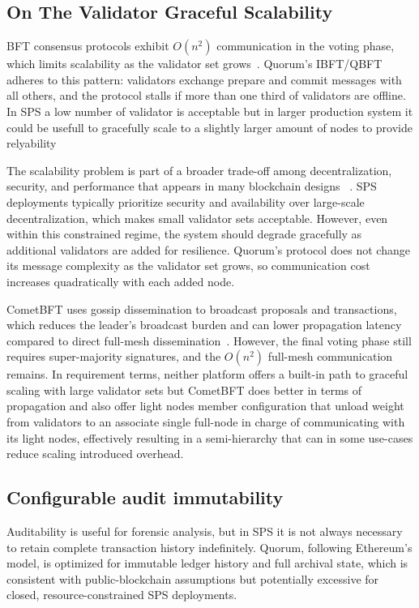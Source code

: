 \subsection{On The Validator Graceful Scalability}
BFT consensus protocols exhibit $O(n^2)$ communication in the voting phase, which limits scalability as the validator set grows~\cite{wang2022bft}. Quorum's IBFT/QBFT adheres to this pattern: validators exchange prepare and commit messages with all others, and the protocol stalls if more than one third of validators are offline. In SPS a low number of validator is acceptable but in larger production system it could be usefull to gracefully scale to a slightly larger amount of nodes to provide relyability

The scalability problem is part of a broader trade-off among decentralization, security, and performance that appears in many blockchain designs ~\cite{monte2020scaling}. SPS deployments typically prioritize security and availability over large-scale decentralization, which makes small validator sets acceptable. However, even within this constrained regime, the system should degrade gracefully as additional validators are added for resilience. Quorum's protocol does not change its message complexity as the validator set grows, so communication cost increases quadratically with each added node.

CometBFT uses gossip dissemination to broadcast proposals and transactions, which reduces the leader's broadcast burden and can lower propagation latency compared to direct full-mesh dissemination~\cite{buchman2018latest}. However, the final voting phase still requires super-majority signatures, and the $O(n^2)$ full-mesh communication remains. In requirement terms, neither platform offers a built-in path to graceful scaling with large validator sets but CometBFT does better in terms of propagation and also offer light nodes member configuration that unload weight from validators to an associate single full-node in charge of communicating with its light nodes, effectively resulting in a semi-hierarchy that can in some use-cases reduce scaling introduced overhead.

\subsection{Configurable audit immutability}
Auditability is useful for forensic analysis, but in SPS it is not always necessary to retain complete transaction history indefinitely. Quorum, following Ethereum's model, is optimized for immutable ledger history and full archival state, which is consistent with public-blockchain assumptions but potentially excessive for closed, resource-constrained SPS deployments.

